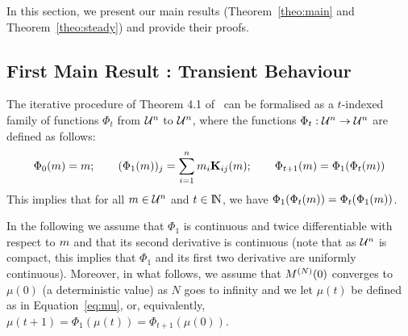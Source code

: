 \documentclass[review]{elsarticle}
\begin{document}
In this section, we present our main results (Theorem~\ref{theo:main}
and Theorem~\ref{theo:steady}) and provide their proofs.

\subsection{First Main Result : Transient Behaviour}

The iterative procedure of Theorem 4.1 of~\cite{Le+07}  can be
formalised as a $t$-indexed family of functions $\Phi_t$ from
${\cal U}^n$ to ${\cal U}^n$, where the functions
$\Phi_t: {\cal U}^n \rightarrow {\cal U}^n$ are defined as follows:
\begin{align*}
  \Phi_{0}(m) = m; \qquad {\displaystyle (\Phi_1(m))_j =
  \sum_{i=1}^n m_i \mathbf{K}_{ij}(m)};
  \qquad \Phi_{t+1}(m) = \Phi_1(\Phi_t(m))
\end{align*}
This implies that for all $m \in {\cal U}^n$ and $t \in \mathrm{I\!N}$, we
have $\Phi_1(\Phi_t(m))= \Phi_t(\Phi_1(m))$.

In the following we assume that $\Phi_{1}$ is continuous and twice
differentiable with respect to $m$ and that its second derivative
is continuous (note that as ${\cal U}^n$ is compact, this implies that
$\Phi_1$ and its first two derivative are uniformly continuous).
Moreover, in what follows, we assume that $M^{(N)}(0)$ converges to
$\mu(0)$ (a deterministic value) as $N$ goes to infinity and we let
$\mu(t)$ be defined as in Equation~\eqref{eq:mu}, or, equivalently,
$\mu(t+1)=\Phi_1(\mu(t))=\Phi_{t+1}(\mu(0))$.
\end{document}
